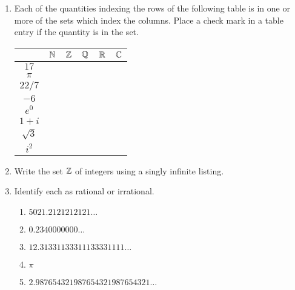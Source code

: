 \begin{enumerate}

\item Each of the quantities indexing the rows of the following table
is in one or more of the sets which index the columns.  Place a 
check mark in a table entry if the quantity is in the set.

\begin{tabular}{|c||c|c|c|c|c|} \hline
 & ${\mathbb N}$ & ${\mathbb Z}$ & ${\mathbb Q}$ & ${\mathbb R}$ & ${\mathbb C}$
 \\ \hline\hline
\rule{0pt}{15pt} $17$ & & & & & \\ \hline
\rule{0pt}{15pt} $\pi$ & & & & & \\ \hline
\rule{0pt}{15pt} $22/7$ & & & & & \\ \hline
\rule{0pt}{15pt} $-6$ & & & & & \\ \hline
\rule{0pt}{15pt} $e^0$ & & & & & \\ \hline
\rule{0pt}{15pt} $1+i$ & & & & & \\ \hline
\rule{0pt}{15pt} $\sqrt{3}$ & & & & & \\ \hline
\rule{0pt}{15pt} $i^2$ & & & & & \\  \hline
\end{tabular}


\vfill

\hintspagebreak
\workbookpagebreak

\item Write the set ${\mathbb Z}$ of integers using a singly infinite
listing.

\twsvspace{.25in}{1in}{.15in}


\vfill


\item Identify each as rational or irrational.
\begin{enumerate}
\item $5021.2121212121\ldots$
\item $0.2340000000\ldots$
\item $12.31331133311133331111\ldots$
\item $\pi$
\item $2.987654321987654321987654321\ldots$
\end{enumerate}


\end{enumerate}
